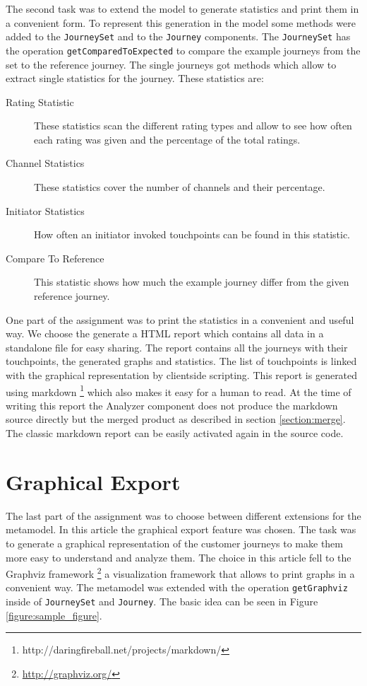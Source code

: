 \documentclass[12pt]{scrartcl}
\begin{document}
The second task was to extend the model to generate statistics and print them in a convenient form. To represent
this generation in the model some methods were added to the \lstinline!JourneySet! and to the \lstinline!Journey!
components. The \lstinline!JourneySet! has the operation \lstinline!getComparedToExpected! to compare the example 
journeys from the set to the reference journey. The single journeys got methods which allow to extract single
statistics for the journey. These statistics are:
\begin{description}
	\item[Rating Statistic] These statistics scan the different rating types and allow to see how often each rating
	was given and the percentage of the total ratings.
	\item[Channel Statistics] These statistics cover the number of channels and their percentage.
	\item[Initiator Statistics] How often an initiator invoked touchpoints can be found in this statistic.
	\item[Compare To Reference] This statistic shows how much the example journey differ from the given reference
	journey.
\end{description}

One part of the assignment was to print the statistics in a convenient and useful way.
We choose the generate a HTML report which contains all data in a standalone file for easy sharing. The report
contains all the journeys with their touchpoints, the generated graphs and statistics. The list of touchpoints
is linked with the graphical representation by clientside scripting. This report is generated using markdown
\footnote{http://daringfireball.net/projects/markdown/} which also makes it easy for a human to read. At the time
of writing this report the Analyzer component does not  produce the markdown source directly but the merged product as 
described in  section \ref{section:merge}. The classic markdown report can be easily activated again in the source code.

\section{Graphical Export} 
\label{section:export}

The last part of the assignment was to choose between different extensions for the metamodel. In this article
the graphical export feature was chosen. The task was to generate a graphical representation of the customer
journeys to make them more easy to understand and analyze them. The choice in this article fell to the Graphviz framework 
\footnote{\url{http://graphviz.org/}} a visualization framework that allows to print graphs in a convenient way.
The metamodel was extended with the operation \lstinline!getGraphviz! inside of \lstinline!JourneySet! and
\lstinline!Journey!. The basic idea can be seen in Figure \ref{figure:sample_figure}.
\end{document}
